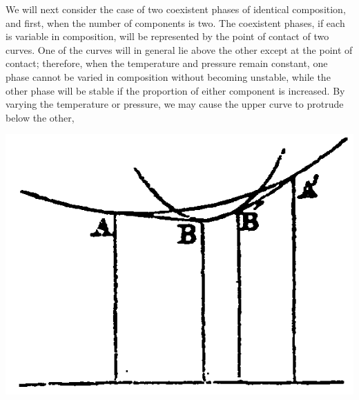 \documentclass[12pt]{memoir}
\begin{document}
\noindent\begin{minipage}[c]{0.6\textwidth}
We will next consider the case of two coexistent phases of identical composition, and first, when the number of components is two. The coexistent phases, if each is variable in composition, will be represented by the point of contact of two curves. One of the curves will in general lie above the other except at the point of contact; therefore, when the temperature and pressure remain constant, one phase cannot be varied in composition without becoming unstable, while the other phase will be stable if the proportion of either component is increased. By varying the temperature or pressure, we may cause the upper curve to protrude below the other,
\end{minipage}
\begin{minipage}[c]{0.39\textwidth}
    \includegraphics[width=1\textwidth]{fig_6}
    \label{fig_6}
\end{minipage}
\noindent
\end{document}

